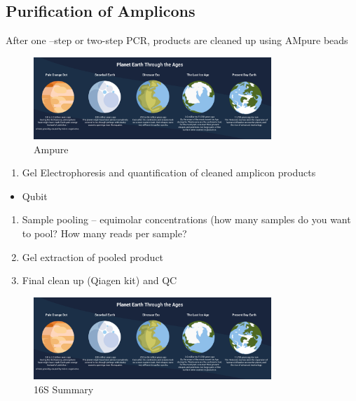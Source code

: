 \documentclass[
]{book}
\providecommand{\tightlist}{%
  \setlength{\itemsep}{0pt}\setlength{\parskip}{0pt}}
\begin{document}
\hypertarget{purification-of-amplicons}{%
\subsection{Purification of Amplicons}\label{purification-of-amplicons}}

After one --step or two-step PCR, products are cleaned up using AMpure beads

\begin{figure}
\centering
\includegraphics[width=0.8\textwidth,height=\textheight]{./Figures/Planets.png}
\caption{Ampure}
\end{figure}

\begin{enumerate}
\def\labelenumi{\arabic{enumi}.}
\tightlist
\item
  Gel Electrophoresis and quantification of cleaned amplicon products
\end{enumerate}

\begin{itemize}
\tightlist
\item
  Qubit
\end{itemize}

\begin{enumerate}
\def\labelenumi{\arabic{enumi}.}
\setcounter{enumi}{1}
\tightlist
\item
  Sample pooling -- equimolar concentrations (how many samples do you want to pool? How many reads per sample?
\item
  Gel extraction of pooled product
\item
  Final clean up (Qiagen kit) and QC
\end{enumerate}

\begin{figure}
\centering
\includegraphics[width=0.8\textwidth,height=\textheight]{./Figures/Planets.png}
\caption{16S Summary}
\end{figure}
\end{document}
